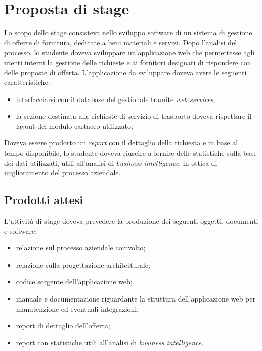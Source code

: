 \section{Proposta di stage}

Lo scopo dello stage consisteva nello sviluppo software di un sistema di gestione di offerte di fornitura, dedicate a beni materiali e servizi. Dopo l'analisi del processo, lo studente doveva sviluppare un'applicazione web che permettesse agli utenti interni la gestione delle richieste e ai fornitori designati di rispondere con delle proposte di offerta.
L'applicazione da sviluppare doveva avere le seguenti caratteristiche:
\begin{itemize}
	\item interfacciarsi con il database del gestionale tramite \textit{web services};
	\item la sezione destinata alle richieste di servizio di trasporto doveva rispettare il layout del modulo cartaceo utilizzato;
\end{itemize}
Doveva essere prodotto un \textit{report} con il dettaglio della richiesta e in base al tempo disponibile, lo studente doveva riuscire a fornire delle statistiche sulla base dei dati utilizzati, utili all'analisi di \textit{business intelligence}, in ottica di miglioramento del processo aziendale.


\subsection{Prodotti attesi}
L'attività di stage doveva prevedere la produzione dei seguenti oggetti, documenti e software:
\begin{itemize}
	\item relazione sul processo aziendale coinvolto;
	\item relazione sulla progettazione architetturale;
	\item codice sorgente dell'applicazione web;
	\item manuale e documentazione riguardante la struttura dell'applicazione web per
	manutenzione ed eventuali integrazioni;
	\item report di dettaglio dell'offerta;
	\item report con statistiche utili all'analisi di \textit{business intelligence}.
\end{itemize}


